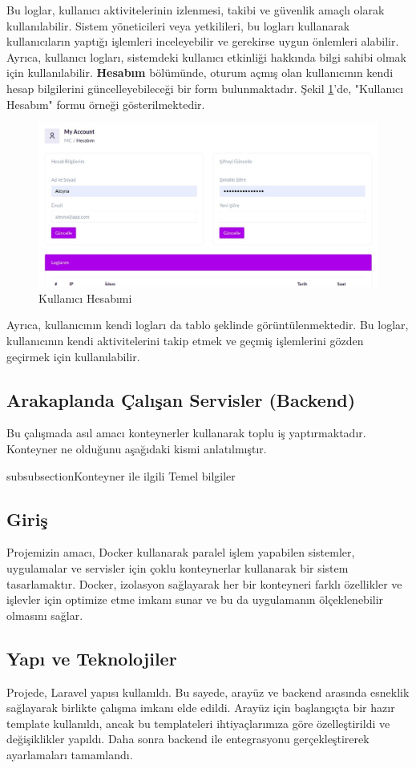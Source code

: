 Bu loglar, kullanıcı aktivitelerinin izlenmesi, takibi ve güvenlik amaçlı olarak kullanılabilir. Sistem yöneticileri veya yetkilileri, bu logları kullanarak kullanıcıların yaptığı işlemleri inceleyebilir ve gerekirse uygun önlemleri alabilir. Ayrıca, kullanıcı logları, sistemdeki kullanıcı etkinliği hakkında bilgi sahibi olmak için kullanılabilir.
\textbf{Hesabım} bölümünde, oturum açmış olan kullanıcının kendi hesap bilgilerini güncelleyebileceği bir form bulunmaktadır. Şekil \ref{fig:account}'de, "Kullanıcı Hesabım" formu örneği gösterilmektedir.
\begin{figure}[ht]
  \centering
  \includegraphics[width=0.6\linewidth]{images/account.jpeg}
  \caption{Kullanıcı Hesabımi}
  \label{fig:account}
\end{figure}

Ayrıca, kullanıcının kendi logları da tablo şeklinde görüntülenmektedir. Bu loglar, kullanıcının kendi aktivitelerini takip etmek ve geçmiş işlemlerini gözden geçirmek için kullanılabilir.

\subsection{Arakaplanda Çalışan Servisler (Backend)}
Bu çalışmada asıl amacı konteynerler kullanarak toplu iş yaptırmaktadır. Konteyner ne olduğunu aşağıdaki kismi anlatılmıştır.

subsubsection{Konteyner ile ilgili Temel bilgiler}
\subsection{Giriş}
Projemizin amacı, Docker kullanarak paralel işlem yapabilen sistemler, uygulamalar ve servisler için çoklu konteynerlar kullanarak bir sistem tasarlamaktır. Docker, izolasyon sağlayarak her bir konteyneri farklı özellikler ve işlevler için optimize etme imkanı sunar ve bu da uygulamanın ölçeklenebilir olmasını sağlar.
\subsection{Yapı ve Teknolojiler}
Projede, Laravel yapısı kullanıldı. Bu sayede, arayüz ve backend arasında esneklik sağlayarak birlikte çalışma imkanı elde edildi. Arayüz için başlangıçta bir hazır template kullanıldı, ancak bu templateleri ihtiyaçlarımıza göre özelleştirildi ve değişiklikler yapıldı. Daha sonra backend ile entegrasyonu gerçekleştirerek ayarlamaları tamamlandı.
